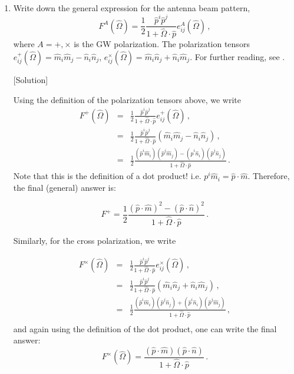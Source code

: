 \documentclass[article, onecolumn, ,nofootinbib,nopreprintnumbers]{revtex4}
\newcommand{\bea}{\begin{eqnarray}}
\newcommand{\eea}{\end{eqnarray}}
\begin{document}
\begin{enumerate}
\begin{figure}[h]
		\label{fig:geometry}
	\end{figure}
\item Write down the general expression for the antenna beam pattern, 
\begin{equation}
F^A(\hat \Omega) = \frac{1}{2} \frac{\hat p^i \hat p^j}{1+\hat\Omega\cdot\hat p} e^A_{ij}(\hat\Omega) \, ,  
\end{equation}
where $A=+,\times$ is the GW polarization. The polarization tensors $e^+_{ij}(\hat \Omega) = \hat m_i\hat m_j - \hat n_i \hat n_j$, $e^\times_{ij} (\hat \Omega)= \hat m_i \hat n_j + \hat n_i \hat m_j$. For further reading, see \cite{AllenRomano:1999, Anholm:09}. 


[Solution]

Using the definition of the polarization tensors above, we write
\bea
F^+(\hat \Omega) &=& \frac{1}{2} \frac{\hat p^i \hat p^j}{1+\hat\Omega\cdot\hat p} e^+_{ij}(\hat\Omega) \, ,  \\
 &=& \frac{1}{2} \frac{\hat p^i \hat p^j}{1+\hat\Omega\cdot\hat p}(\hat m_i\hat m_j - \hat n_i \hat n_j)\, ,  \\
 &=& \frac{1}{2} \frac{(\hat p^i \hat m_i) (\hat p^j \hat m_j) - (\hat p^i \hat n_i) (\hat p^j \hat n_j)}{1+\hat\Omega\cdot\hat p}\, . 
\eea
Note that this is the definition of a dot product! i.e. $p^i \hat m_i = \hat p \cdot \hat m$. Therefore, the final (general) answer is:

\begin{equation}
F^+ = \frac{1}{2} \frac{(\hat p \cdot \hat m)^2 - (\hat p\cdot\hat n)^2}{1+\hat\Omega\cdot\hat p}\, . 
\end{equation}

Similarly, for the cross polarization, we write

\bea
F^\times(\hat \Omega) &=& \frac{1}{2} \frac{\hat p^i \hat p^j}{1+\hat\Omega\cdot\hat p} e^\times_{ij}(\hat\Omega) \, ,  \\ 
&=& \frac{1}{2} \frac{\hat p^i \hat p^j}{1+\hat\Omega\cdot\hat p}(\hat m_i \hat n_j + \hat n_i \hat m_j)\, , \\
&=& \frac{1}{2} \frac{(\hat p^i \hat m_i) (\hat p^j \hat n_j) + (\hat p^i  \hat n_i) (\hat p^j \hat m_j)}{1+\hat\Omega\cdot\hat p} \, , \\
\eea
and again using the definition of the dot product, one can write the final answer:
\begin{equation}
F^\times(\hat \Omega) = \frac{(\hat p \cdot \hat m) (\hat p \cdot \hat n) }{1+\hat\Omega\cdot\hat p} \, .
\end{equation}





\end{enumerate}
\end{document}
